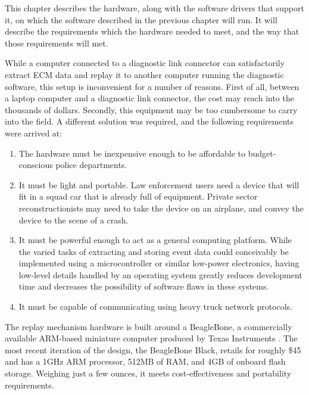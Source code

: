 
This chapter describes the hardware, along with the software drivers that support it, on which
the software described in the previous chapter will run. It will describe the requirements which
the hardware needed to meet, and the way that those requirements will met.



While a computer connected to a diagnostic link connector can satisfactorily extract ECM data and replay
it to another computer running the diagnostic software, this setup is inconvenient for a number of reasons.
First of all, between a laptop computer and a diagnostic link connector, the cost 
may reach into the thousands of dollars. Secondly, this equipment may be too cumbersome to carry into the field.
A different solution was required, and the following requirements were arrived at:

\begin{enumerate}
  \item The hardware must be inexpensive enough to be affordable to budget-conscious police departments.
  \item It must be light and portable. Law enforcement users need a device that will fit in a squad car that is already full of equipment.
        Private sector reconstructionists may need to take the device on an airplane, and convey the device to the scene of a crash.
  \item It must be powerful enough to act as a general computing platform. While the varied tasks of extracting and storing event data 
        could conceivably be implemented using a microcontroller or similar low-power electronics, having low-level details handled by
        an operating system greatly reduces development time and decreases the possibility of software flaws in these systems.
  \item It must be capable of communicating using heavy truck network protocols.
\end{enumerate}



The replay mechanism hardware is built around a BeagleBone, a commercially available ARM-based miniature computer produced
by Texas Instruments \cite{BeagleBone}. The most recent iteration of the design, the BeagleBone Black, retails for roughly \$45 and has a 1GHz ARM
processor, 512MB of RAM, and 4GB of onboard flash storage. Weighing just a few ounces, it meets cost-effectiveness and portability
requirements.

